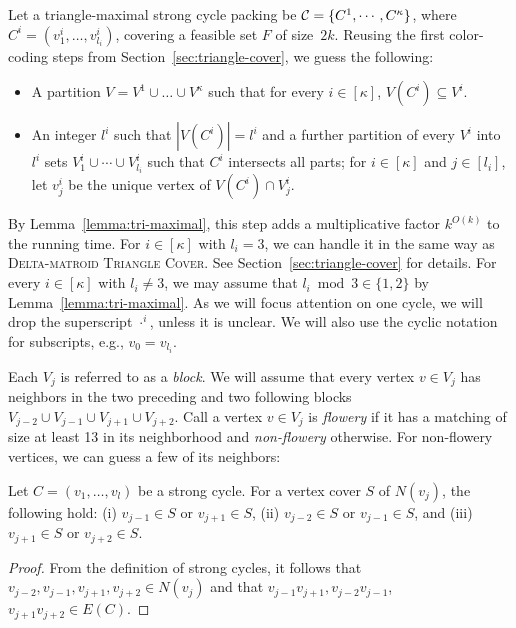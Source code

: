 Let a triangle-maximal strong cycle packing be $\mathcal C = \{ C^1, \cdots, C^{\kappa} \}$, where $C^i = (v^i_{1}, \dots, v^i_{l_i})$, covering a feasible set $F$ of size~$2k$.
Reusing the first color-coding steps from Section~\ref{sec:triangle-cover}, we guess the following:
\begin{itemize}
\item A partition $V=V^{1} \cup \ldots \cup V^\kappa$ such that for every $i \in [\kappa]$, 
  $V(C^i) \subseteq V^{i}$.
\item An integer $l^i$ such that $|V(C^i)| = l^i$ and a further partition of every $V^{i}$ into $l^i$ sets $V^{i}_1 \cup \cdots \cup V^{i}_{l_i}$ 
  such that $C^i$ intersects all parts; for $i \in [\kappa]$ and $j \in [l_i]$,
  let $v^i_{j}$ be the unique vertex of $V(C^i) \cap V^{i}_{j}$.
\end{itemize}
By Lemma~\ref{lemma:tri-maximal}, this step adds a multiplicative factor $k^{O(k)}$ to the running time.
For $i \in [\kappa]$ with $l_i = 3$, we can handle it in the same way as \textsc{Delta-matroid Triangle Cover}.
See Section~\ref{sec:triangle-cover} for details. 
For every $i \in [\kappa]$ with $l_i \ne 3$, we may assume that $l_i  \bmod 3 \in \{ 1, 2 \}$ by Lemma~\ref{lemma:tri-maximal}.
As we will focus attention on one cycle, we will drop the superscript $\cdot^i$, unless it is unclear.
We will also use the cyclic notation for subscripts, e.g., $v_{0} = v_{l_i}$.

Each $V_j$ is referred to as a \emph{block}.
We will assume that every vertex $v \in V_{j}$ has neighbors in the two preceding and two following blocks $V_{j-2} \cup V_{j-1} \cup V_{j+1} \cup V_{j+2}$.
Call a vertex $v \in V_{j}$ is \emph{flowery} if it has a matching of size at least 13 in its neighborhood and \emph{non-flowery} otherwise.
For non-flowery vertices, we can guess a few of its neighbors:

\begin{lemma} \label{lemma:vc}
  Let $C = (v_1, \dots, v_{l})$ be a strong cycle.
  For a vertex cover $S$ of $N(v_j)$, the following hold: (i) $v_{j-1} \in S$ or $v_{j+1} \in S$, (ii) $v_{j-2} \in S$ or $v_{j-1} \in S$, and (iii) $v_{j+1} \in S$ or $v_{j+2} \in S$.
\end{lemma}
\begin{proof}
  From the definition of strong cycles, it follows that $v_{j-2}, v_{j-1}, v_{j+1}, v_{j+2} \in N(v_j)$ and that $v_{j -1} v_{j+1}, v_{j-2} v_{j-1}$, $v_{j+1} v_{j+2} \in E(C)$.
\end{proof}

